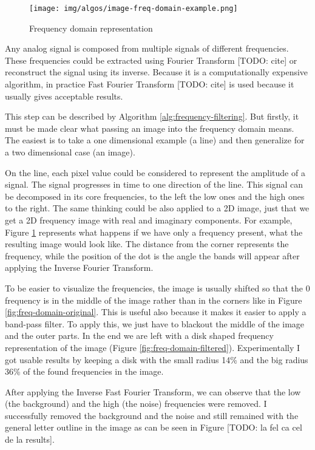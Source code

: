 \begin{figure}
    \centering
    \texttt{[image: img/algos/image-freq-domain-example.png]}
    \caption{Frequency domain representation}
    \label{fig:example-img-freq-domain}
\end{figure}

Any analog signal is composed from multiple signals of different frequencies. These frequencies could be extracted using Fourier Transform [TODO: cite] or reconstruct the signal using its inverse. Because it is a computationally expensive algorithm, in practice Fast Fourier Transform [TODO: cite] is used because it usually gives acceptable results.

This step can be described by Algorithm \ref{alg:frequency-filtering}. But firstly, it must be made clear what passing an image into the frequency domain means. The easiest is to take a one dimensional example (a line) and then generalize for a two dimensional case (an image).

On the line, each pixel value could be considered to represent the amplitude of a signal. The signal progresses in time to one direction of the line. This signal can be decomposed in its core frequencies, to the left the low ones and the high ones to the right. The same thinking could be also applied to a 2D image, just that we get a 2D frequency image with real and imaginary components. For example, Figure \ref{fig:example-img-freq-domain} represents what happens if we have only a frequency present, what the resulting image would look like. The distance from the corner represents the frequency, while the position of the dot is the angle the bands will appear after applying the Inverse Fourier Transform.

To be easier to visualize the frequencies, the image is usually shifted so that the 0 frequency is in the middle of the image rather than in the corners like in Figure \ref{fig:freq-domain-original}. This is useful also because it makes it easier to apply a band-pass filter. To apply this, we just have to blackout the middle of the image and the outer parts. In the end we are left with a disk shaped frequency representation of the image (Figure \ref{fig:freq-domain-filtered}). Experimentally I got usable results by keeping a disk with the small radius 14\% and the big radius 36\% of the found frequencies in the image.

After applying the Inverse Fast Fourier Transform, we can observe that the low (the background) and the high (the noise) frequencies were removed. I successfully removed the background and the noise and still remained with the general letter outline in the image as can be seen in Figure [TODO: la fel ca cel de la results].

